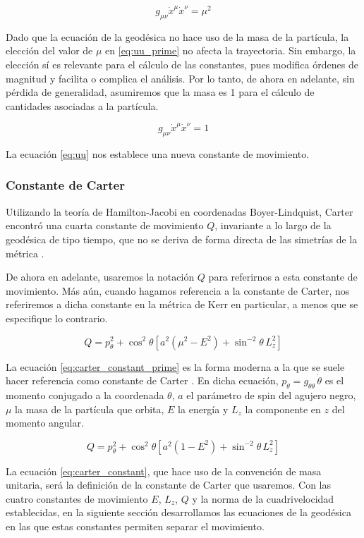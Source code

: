 \begin{equation}
    g_{\mu\nu} \dot{x}^\mu\dot{x}^{\nu} = \mu^2 \label{eq:uu_prime}
\end{equation}

Dado que la ecuación de la geodésica no hace uso de la masa de la partícula, la elección del valor de $\mu$ en \eqref{eq:uu_prime} no afecta la trayectoria. Sin embargo, la elección sí es relevante para el cálculo de las constantes, pues modifica órdenes de magnitud y facilita o complica el análisis. Por lo tanto, de ahora en adelante, sin pérdida de generalidad, asumiremos que la masa es 1 para el cálculo de cantidades asociadas a la partícula.

\begin{equation}
    g_{\mu\nu} \dot{x}^\mu\dot{x}^{\nu} = 1 \label{eq:uu}
\end{equation}

La ecuación \eqref{eq:uu} nos establece una nueva constante de movimiento.


\subsubsection{Constante de Carter}

Utilizando la teoría de Hamilton-Jacobi en coordenadas Boyer-Lindquist, Carter encontró una cuarta constante de movimiento $Q$, invariante a lo largo de la geodésica de tipo tiempo, que no se deriva de forma directa de las simetrías de la métrica \cite{carter1968global}.

De ahora en adelante, usaremos la notación $Q$ para referirnos a esta constante de movimiento. Más aún, cuando hagamos referencia a la constante de Carter, nos referiremos a dicha constante en la métrica de Kerr en particular, a menos que se especifique lo contrario.

\begin{equation}
    Q = p_\theta^2 + \cos^2\theta \left[ a^2(\mu^2 - E^2) + \sin^{-2}\theta\, L_z^2 \right]
    \label{eq:carter_constant_prime}
\end{equation}

La ecuación \eqref{eq:carter_constant_prime} es la forma moderna a la que se suele hacer referencia como constante de Carter \cite{gair2006improved}. En dicha ecuación, $p_\theta = g_{\theta\theta}\,\dot{\theta}$ es el momento conjugado a la coordenada $\theta$, $a$ el parámetro de spin del agujero negro, $\mu$ la masa de la partícula que orbita, $E$ la energía y $L_z$ la componente en $z$ del momento angular.

\begin{equation}
    Q = p_\theta^2 + \cos^2\theta \left[ a^2(1 - E^2) + \sin^{-2}\theta\, L_z^2 \right]
    \label{eq:carter_constant}
\end{equation}

La ecuación \eqref{eq:carter_constant}, que hace uso de la convención de masa unitaria, será la definición de la constante de Carter que usaremos. Con las cuatro constantes de movimiento $E$, $L_z$, $Q$ y la norma de la cuadrivelocidad establecidas, en la siguiente sección desarrollamos las ecuaciones de la geodésica en las que estas constantes permiten separar el movimiento.
